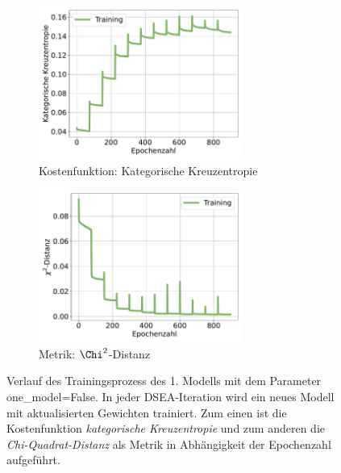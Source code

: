 \begin{figure}%
    \begin{subfigure}{0.5\textwidth}%
        \centering%
        \includegraphics[height=5cm]{Plots/DSEA/False/loss.pdf}%
        \caption{Kostenfunktion: Kategorische Kreuzentropie}%
    \end{subfigure}%
    \hfill%
    \begin{subfigure}{0.5\textwidth}%
        \centering%
        \includegraphics[height=5cm]{Plots/DSEA/False/chi.pdf}%
        \caption{Metrik: $\Chi^2$-Distanz}%
    \end{subfigure}%
    \caption[Verlauf des Trainingsprozesses des 1. Modells in DSEA]{Verlauf des Trainingsprozess des 1. Modells mit dem Parameter one\_model=False.
    In jeder DSEA-Iteration wird ein neues Modell mit aktualisierten Gewichten trainiert.
    Zum einen ist die Kostenfunktion \textit{kategorische Kreuzentropie} und zum anderen die \textit{Chi-Quadrat-Distanz} als Metrik in Abhängigkeit der Epochenzahl aufgeführt.
    }
    \label{fig:dsea_history_false}%
\end{figure}%

